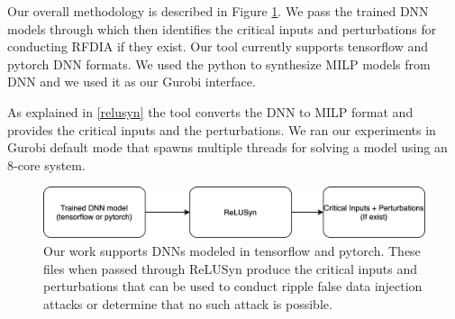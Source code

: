 Our overall methodology is described in Figure \ref{fig:methodology-2}. 
We pass the trained \ac{DNN} models through \tool which then identifies the critical inputs and perturbations for conducting \ac{RFDIA} if they exist. 
Our tool currently supports tensorflow and pytorch  \ac{DNN} formats. 
We used the python to synthesize \ac{MILP} models from \ac{DNN} and we used it as our Gurobi interface. 


As explained in \ref{relusyn} the tool converts the \ac{DNN} to \ac{MILP} format and provides the critical inputs and the perturbations. 
We ran our experiments in Gurobi default mode that spawns multiple threads for solving a model using an 8-core system. 
 

\begin{figure}
	\centering
	\includegraphics[width=0.7\linewidth]{"Images/Methodology2"}
	\caption[Methodology]{Our work supports DNNs modeled in tensorflow and pytorch. These files when passed through ReLUSyn produce the critical inputs and perturbations that can be used to conduct ripple false data injection attacks or determine that no such attack is possible.}
	\label{fig:methodology-2}
\end{figure}



